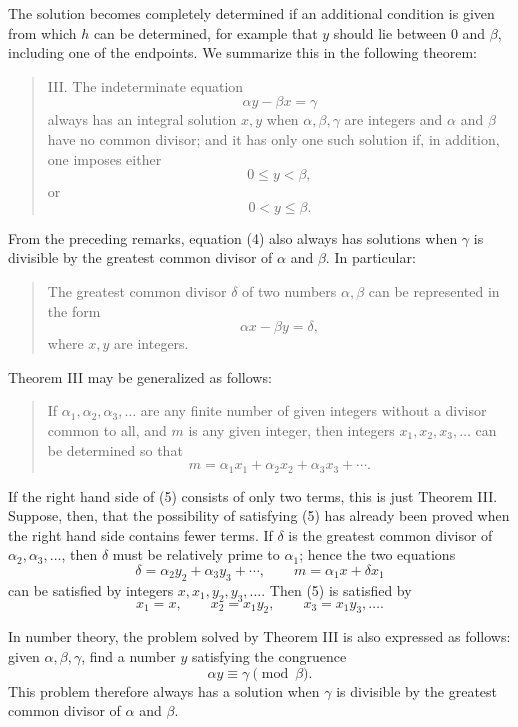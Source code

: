 \documentclass[11pt]{article}
\begin{document}
The solution becomes completely determined if an additional condition is given from which $h$ can be determined, for example that $y$ should lie between $0$ and $\beta$, including one of the endpoints. We summarize this in the following theorem:

\begin{quote}
III. The indeterminate equation
\[
        \alpha y-\beta x=\gamma
\]
always has an integral solution $x,y$ when $\alpha,\beta,\gamma$ are integers and $\alpha$ and $\beta$ have no common divisor; and it has only one such solution if, in addition, one imposes either
\[
        0\le y<\beta,
\]
or
\[
        0<y\le \beta.
\]
\end{quote}

From the preceding remarks, equation (4) also always has solutions when $\gamma$ is divisible by the greatest common divisor of $\alpha$ and $\beta$. In particular:
\begin{quote}
The greatest common divisor $\delta$ of two numbers $\alpha,\beta$ can be represented in the form
\[
        \alpha x-\beta y=\delta,
\]
where $x,y$ are integers.
\end{quote}

Theorem III may be generalized as follows:
\begin{quote}
If $\alpha_1,\alpha_2,\alpha_3,\ldots$ are any finite number of given integers without a divisor common to all, and $m$ is any given integer, then integers $x_1,x_2,x_3,\ldots$ can be determined so that
\[
\tag{5}        m=\alpha_1x_1+\alpha_2x_2+\alpha_3x_3+\cdots.
\]
\end{quote}

If the right hand side of (5) consists of only two terms, this is just Theorem III. Suppose, then, that the possibility of satisfying (5) has already been proved when the right hand side contains fewer terms. If $\delta$ is the greatest common divisor of $\alpha_2,\alpha_3,\ldots$, then $\delta$ must be relatively prime to $\alpha_1$; hence the two equations
\[
        \delta=\alpha_2y_2+\alpha_3y_3+\cdots,
        \qquad
        m=\alpha_1x+\delta x_1
\]
can be satisfied by integers $x,x_1,y_2,y_3,\ldots$. Then (5) is satisfied by
\[
        x_1=x,
        \qquad
        x_2=x_1y_2,
        \qquad
        x_3=x_1y_3,
        \ldots.
\]

In number theory, the problem solved by Theorem III is also expressed as follows: given $\alpha,\beta,\gamma$, find a number $y$ satisfying the congruence
\[
        \alpha y\equiv \gamma \pmod{\beta}.
\]
This problem therefore always has a solution when $\gamma$ is divisible by the greatest common divisor of $\alpha$ and $\beta$.
\end{document}

